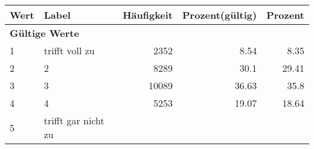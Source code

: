      \begin{longtable}{lXrrr}
     \toprule
     \textbf{Wert} & \textbf{Label} & \textbf{Häufigkeit} & \textbf{Prozent(gültig)} & \textbf{Prozent} \\
     \endhead
     \midrule
     \multicolumn{5}{l}{\textbf{Gültige Werte}}\\

     1 &
     \multicolumn{1}{X}{ trifft voll zu   } &


       \num{2352} &
       \num[round-mode=places,round-precision=2]{8,54} &
         \num[round-mode=places,round-precision=2]{8,35} \\

     2 &
     \multicolumn{1}{X}{ 2   } &


       \num{8289} &
       \num[round-mode=places,round-precision=2]{30,1} &
         \num[round-mode=places,round-precision=2]{29,41} \\

     3 &
     \multicolumn{1}{X}{ 3   } &


       \num{10089} &
       \num[round-mode=places,round-precision=2]{36,63} &
         \num[round-mode=places,round-precision=2]{35,8} \\

     4 &
     \multicolumn{1}{X}{ 4   } &


       \num{5253} &
       \num[round-mode=places,round-precision=2]{19,07} &
         \num[round-mode=places,round-precision=2]{18,64} \\

     5 &
     \multicolumn{1}{X}{ trifft gar nicht zu   } &



\end{longtable}
